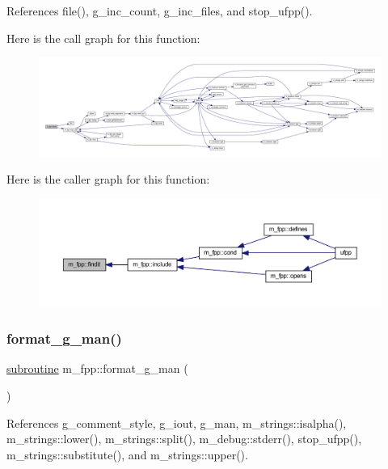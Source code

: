 References file(), g\+\_\+inc\+\_\+count, g\+\_\+inc\+\_\+files, and stop\+\_\+ufpp().

Here is the call graph for this function\+:
\nopagebreak
\begin{figure}[H]
\begin{center}
\leavevmode
\includegraphics[width=350pt]{namespacem__fpp_a53852a7bdeabe727148d17df3448caae_cgraph}
\end{center}
\end{figure}
Here is the caller graph for this function\+:
\nopagebreak
\begin{figure}[H]
\begin{center}
\leavevmode
\includegraphics[width=350pt]{namespacem__fpp_a53852a7bdeabe727148d17df3448caae_icgraph}
\end{center}
\end{figure}
\mbox{\label{namespacem__fpp_ae366d933366dea7f28b44653b5ef04d6}} 
\subsubsection{\texorpdfstring{format\+\_\+g\+\_\+man()}{format\_g\_man()}}
{\footnotesize\ttfamily \hyperlink{M__stopwatch_83_8txt_acfbcff50169d691ff02d4a123ed70482}{subroutine} m\+\_\+fpp\+::format\+\_\+g\+\_\+man (\begin{DoxyParamCaption}{ }\end{DoxyParamCaption})}



References g\+\_\+comment\+\_\+style, g\+\_\+iout, g\+\_\+man, m\+\_\+strings\+::isalpha(), m\+\_\+strings\+::lower(), m\+\_\+strings\+::split(), m\+\_\+debug\+::stderr(), stop\+\_\+ufpp(), m\+\_\+strings\+::substitute(), and m\+\_\+strings\+::upper().

